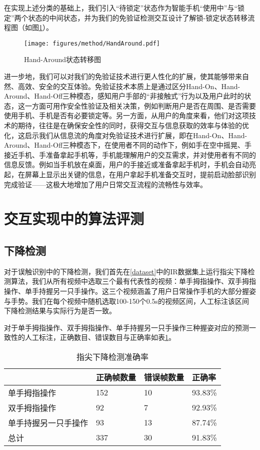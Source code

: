 在实现上述分类的基础上，我们引入“待锁定”状态作为智能手机“使用中”与“锁定”两个状态的中间状态，并为我们的免验证检测交互设计了解锁-锁定状态转移流程图（如图\ref{fig:hand_around}）。

\begin{figure}[h]
  \centering
  \texttt{[image: figures/method/HandAround.pdf]}
  \caption{Hand-Around状态转移图}
  \label{fig:hand_around}
\end{figure}

进一步地，我们可以对我们的免验证技术进行更人性化的扩展，使其能够带来自然、高效、安全的交互体验。免验证技术本质上是通过区分Hand-On、Hand-Around、Hand-Off三种模态，感知用户手部的“非接触式”行为以及用户此时的状态，这一方面可用作安全性验证及相关决策，例如判断用户是否在周围、是否需要使用手机、手机是否有必要锁定等。另一方面，从用户的角度来看，他们对这项技术的期待，往往是在确保安全性的同时，获得交互与信息获取的效率与体验的优化，这启示我们从信息流的角度对免验证技术进行扩展，即在Hand-On、Hand-Around、Hand-Off三种模态下，在使用者不同的动作下，例如手在空中摇晃、手接近手机、手准备拿起手机等，手机能理解用户的交互需求，并对使用者有不同的信息反馈。例如当手机放在桌面，用户的手接近或准备拿起手机时，手机会自动亮起，在屏幕上显示出关键的信息，在用户拿起手机准备交互时，提前启动脸部识别完成验证——这极大地增加了用户日常交互流程的流畅性与效率。

\section{交互实现中的算法评测}

\subsection{下降检测}
对于误触识别中的下降检测，我们首先在\ref{dataset}中的IR数据集上运行指尖下降检测算法，我们从所有视频中选取三个最有代表性的视频：单手拇指操作、双手拇指操作、单手持握另一只手操作。这三个视频涵盖了用户日常操作手机的大部分握姿与手势。我们在每个视频中随机选取100-150个0.5s的视频区间，人工标注该区间下降检测结果与实际行为是否一致。

对于单手拇指操作、双手拇指操作、单手持握另一只手操作三种握姿对应的预测一致性的人工标注，正确数目、错误数目与正确率如表\ref{tbl:fingertip_movement}。

\begin{table}[htbp]
\centering
\caption{指尖下降检测准确率}
\label{tbl:fingertip_movement}
\begin{tabular}{p{130 pt}|p{60 pt}p{60 pt}p{60 pt}}
 \toprule
    & 正确帧数量 & 错误帧数量 & 正确率\\
 \midrule
    单手拇指操作 & 152 & 10 & 93.83\% \\
    双手拇指操作 & 92 & 7 & 92.93\% \\
    单手持握另一只手操作 & 93 & 13 & 87.74\% \\
\midrule        
    总计 & 337 & 30 & 91.83\% \\
\bottomrule
 \end{tabular}\\[2pt]
\end{table}

